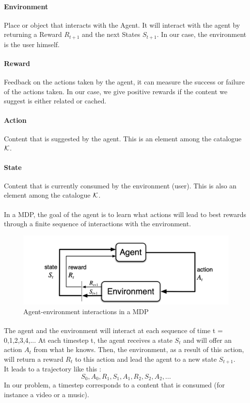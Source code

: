 \documentclass[a4paper]{article}
\begin{document}
\paragraph{Environment} Place or object that interacts with the Agent. It will interact with the agent by returning a Reward $R_{t+1}$ and the next States $S_{t+1}$. In our case, the environment is the user himself.  
\paragraph{Reward}  Feedback on the actions taken by the agent, it can measure the success or failure of the actions taken. In our case, we give positive rewards if the content we suggest is either related or cached.
\paragraph{Action} Content that is suggested by the agent. This is an element among the catalogue $\cal{K}$. 
\paragraph{State} Content that is currently consumed by the environment (user). This is also an element among the catalogue $\cal{K}$. 




\paragraph{} In a MDP, the goal of the agent is to learn what actions will lead to best rewards through a finite sequence of interactions with the environment. 

\begin{figure}[h!]
\begin{center}
\includegraphics[width=0.8\linewidth]{img/mdp.png}
\caption{Agent-environment interactions in a MDP}
\end{center}
\end{figure}

\paragraph{} The agent and the environment will interact at each sequence of time t = 0,1,2,3,4,... At each timestep t, the agent receives a state $S_t$ and will offer an action $A_t$ from what he knows. Then, the environment, as a result of this action, will return a reward $R_t$ to this action and lead the agent to a new state $S_{t+1}$. \\
It leads to a trajectory like this : 
\[ S_0, A_0,  R_1, S_1, A_1, R_2, S_2, A_2, ... \]
In our problem, a timestep corresponds to a content that is consumed (for instance a video or a music).
\end{document}
